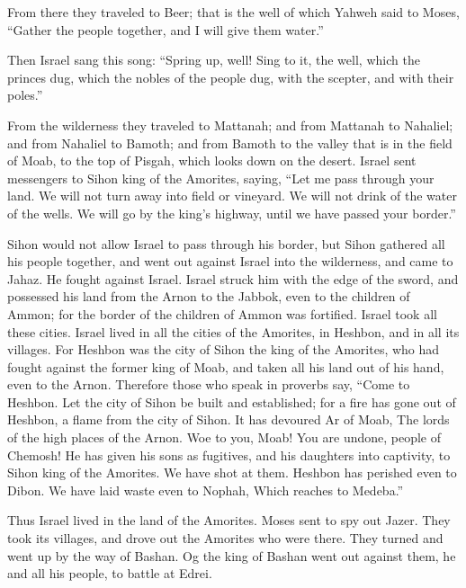  From there they traveled to Beer; that is the well of
which Yahweh said to Moses, ``Gather the people together, and I will
give them water.''

 Then Israel sang this song: ``Spring up, well! Sing to
it,  the well, which the princes dug, which the nobles of
the people dug, with the scepter, and with their poles.''

From the wilderness they traveled to Mattanah;  and from
Mattanah to Nahaliel; and from Nahaliel to Bamoth;  and
from Bamoth to the valley that is in the field of Moab, to the top of
Pisgah, which looks down on the desert.  Israel sent
messengers to Sihon king of the Amorites, saying,  ``Let
me pass through your land. We will not turn away into field or vineyard.
We will not drink of the water of the wells. We will go by the king's
highway, until we have passed your border.''

 Sihon would not allow Israel to pass through his border,
but Sihon gathered all his people together, and went out against Israel
into the wilderness, and came to Jahaz. He fought against Israel.
 Israel struck him with the edge of the sword, and
possessed his land from the Arnon to the Jabbok, even to the children of
Ammon; for the border of the children of Ammon was fortified.
 Israel took all these cities. Israel lived in all the
cities of the Amorites, in Heshbon, and in all its villages.
 For Heshbon was the city of Sihon the king of the
Amorites, who had fought against the former king of Moab, and taken all
his land out of his hand, even to the Arnon.  Therefore
those who speak in proverbs say, ``Come to Heshbon. Let the city of
Sihon be built and established;  for a fire has gone out
of Heshbon, a flame from the city of Sihon. It has devoured Ar of Moab,
The lords of the high places of the Arnon.  Woe to you,
Moab! You are undone, people of Chemosh! He has given his sons as
fugitives, and his daughters into captivity, to Sihon king of the
Amorites.  We have shot at them. Heshbon has perished
even to Dibon. We have laid waste even to Nophah, Which reaches to
Medeba.''

 Thus Israel lived in the land of the Amorites.
 Moses sent to spy out Jazer. They took its villages, and
drove out the Amorites who were there.  They turned and
went up by the way of Bashan. Og the king of Bashan went out against
them, he and all his people, to battle at Edrei.

